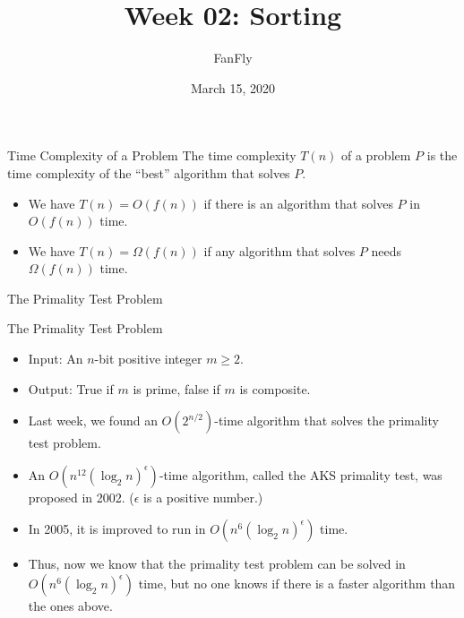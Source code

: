 \documentclass{beamer}
\title{Week 02: Sorting}
\author{FanFly}
\date{March 15, 2020}
\begin{document}
\begin{frame}
  \titlepage
\end{frame}

\begin{frame}{Time Complexity of a Problem}
  The time complexity $T(n)$ of a problem $P$ is the time complexity of the
  ``best'' algorithm that solves $P$. \pause
  \begin{itemize}
    \item We have $T(n) = O(f(n))$
    if there is an algorithm that solves $P$ in $O(f(n))$ time. \pause
    \item We have $T(n) = \Omega(f(n))$
    if any algorithm that solves $P$ needs $\Omega(f(n))$ time.
  \end{itemize}
\end{frame}

\begin{frame}{The Primality Test Problem}
  \begin{block}{The Primality Test Problem}
    \begin{itemize}
      \item Input: An $n$-bit positive integer $m \geq 2$.
      \item Output: True if $m$ is prime, false if $m$ is composite. \pause
    \end{itemize}
  \end{block}
  \begin{itemize}
    \item Last week, we found an $O(2^{n/2})$-time algorithm that solves the
    primality test problem. \pause
    \item An $O(n^{12}(\log_2 n)^\epsilon)$-time algorithm, called the AKS
    primality test, was proposed in 2002.
    ($\epsilon$ is a positive number.) \pause
    \item In 2005, it is improved to run in $O(n^6(\log_2 n)^\epsilon)$ time.
    \pause
    \item Thus, now we know that the primality test problem can be solved in
    $O(n^6(\log_2 n)^\epsilon)$ time, but no one knows if there is a faster
    algorithm than the ones above.
  \end{itemize}
\end{frame}
\end{document}
